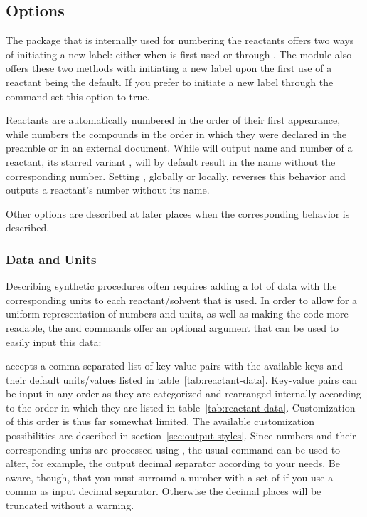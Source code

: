 \documentclass{chemmacros-manual}
\begin{document}
\subsection{Options}
\begin{options}
    The  package that is internally used for numbering the
    reactants offers two ways of initiating a new label: either when 
    is first used or through .  The  module
    also offers these two methods with initiating a new label upon the first
    use of a reactant being the default.   If you prefer to initiate a
    new label through the  command set this option to
    true.

    Reactants are automatically numbered in the order of their first
    appearance, while  numbers the compounds in the order in
    which they were declared in the preamble or in an external document.
    While  will output name and number of a reactant, its starred variant 
     , will by default result in the name without the corresponding number. 
     Setting , globally or locally, reverses this behavior and outputs
      a reactant's number without its name.
\end{options}
Other options are described at later places when the corresponding behavior is
described.

\subsubsection{Data and Units}

Describing synthetic procedures often requires adding a lot of data with the
corresponding units to each reactant/solvent that is used. In order to allow for a
uniform representation of numbers and units, as well as making the code more
readable, the  and  commands offer an optional argument 
that can be used to easily input this data: 

\begin{commands}
\end{commands}


 accepts a comma separated list of key-value pairs with the available
keys and their default units/values listed in table~\vref{tab:reactant-data}. 
Key-value pairs can be input in any order as they are categorized and rearranged internally 
according to the order in which they are listed in table~\vref{tab:reactant-data}. Customization 
of this order is thus far somewhat limited. The available customization possibilities are  
described in section~\vref{sec:output-styles}. Since numbers and their corresponding units are processed 
using , the usual  command can be used to alter, for example, the output 
decimal separator according to your needs. Be aware, though, that you must surround a number with 
a set of \code{\{\}} if you use a comma as input decimal separator. Otherwise the decimal places 
will be truncated without a warning. 
\end{document}
